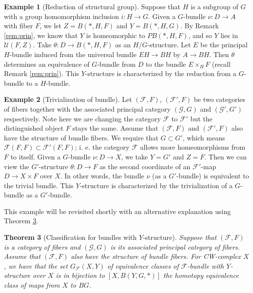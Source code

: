 \documentclass[psamsfonts]{amsart}
\newtheorem{thm}{Theorem}[section]
\theoremstyle{definition}
\newtheorem{exmp}[thm]{Example}
\theoremstyle{remark}
\numberwithin{equation}{section}
\begin{document}
\begin{exmp} [Reduction of structural group]
Suppose that $H$ is a subgroup of $G$ with a group homomorphism inclusion $i: H \to G$. Given a $G$-bundle $\nu: D \to A$ with fiber $F$, we let $Z = B(*, H, F)$ and $Y = B(*, H, G)$. By Remark \ref{rem:prin}, we know that $Y$ is homeomorphic to $PB(*, H, F)$, and so $Y$ lies in $\mathcal{U}(F, Z)$. Take $\theta: D \to B(*, H, F)$ as an $H/G$-structure. Let $E$ be the principal $H$-bundle induced from the universal bundle $EH \to BH$ by $A \to BH$. Then $\theta$ determines an equivalence of $G$-bundle from $D$ to the bundle $E \times_{H}F$ (recall Remark \ref{rem:prin}). This $Y$-structure is characterized by the reduction from a $G$-bundle to a $H$-bundle.
\end{exmp}

\begin{exmp} [Trivialization of bundle] 
\label{exp:trivialization}
Let $(\mathcal{F}, F)$, $(\mathcal{F'}, F)$ be two categories of fibers together with the associated principal category $(\mathcal{G}, G)$ and $(\mathcal{G}', G')$ respectively. Note here we are changing the category $\mathcal{F}$ to $\mathcal{F}'$ but the distinguished object $F$ stays the same. Assume that $(\mathcal{F}, F)$ and $(\mathcal{F'}, F)$ also have the structure of bundle fibers. We require that $G \subset G'$, which means $\mathcal{F}(F, F) \subset \mathcal{F}'(F, F)$; i. e. the category $\mathcal{F}$ allows more homeomorphisms from $F$ to itself. Given a $G$-bundle $\nu: D \to X$, we take $Y = G'$ and $Z = F$. Then we can view the $G'$-structure $\theta: D \to F$ as the second coordinate of an $\mathcal{F'}$-map $D \to X \times F$ over $X$. In other words, the bundle $\nu$ (as a $G'$-bundle) is equivalent to the trivial bundle. This $Y$-structure is characterized by the trivialization of a $G$-bundle as a $G'$-bundle.

This example will be revisited shortly with an alternative explanation using Theorem \ref{thm:Yclassification}.
\end{exmp}

\begin{thm} [Classification for bundles with $Y$-structure]
\label{thm:Yclassification}
Suppose that $(\mathcal{F}, F)$ is a category of fibers and $(\mathcal{G}, G)$ is its associated principal category of fibers. Assume that $(\mathcal{F}, F)$ also have the structure of bundle fibers. For CW-complex $X$, we have that the set $G_{\mathcal{F}}(X, Y)$ of equivalence classes of $\mathcal{F}$-bundle with $Y$-structure over $X$ is in bijection to $[X, B(Y, G, *)]$ the homotopy equivalence class of maps from $X$ to $BG$.
\end{thm}
\end{document}
